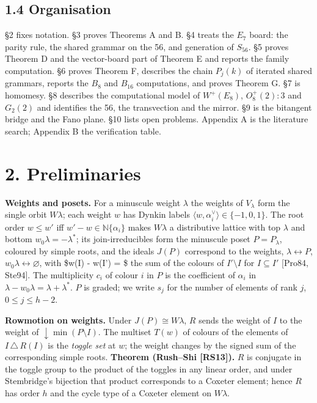 \documentclass[
]{article}
\begin{document}
\subsection{1.4 Organisation}\label{organisation}

§2 fixes notation. §3 proves Theorems A and B. §4 treats the \(E_7\)
board: the parity rule, the shared grammar on the 56, and generation of
\(S_{56}\). §5 proves Theorem D and the vector-board part of Theorem E
and reports the family computation. §6 proves Theorem F, describes the
chain \(P_j(k)\) of iterated shared grammars, reports the \(B_8\) and
\(B_{16}\) computations, and proves Theorem G. §7 is homomesy. §8
describes the computational model of \(W^+(E_8)\), \(O_8^+(2){:}3\) and
\(G_2(2)\) and identifies the 56, the transvection and the mirror. §9 is
the bitangent bridge and the Fano plane. §10 lists open problems.
Appendix A is the literature search; Appendix B the verification table.

\section{2. Preliminaries}\label{preliminaries}

\textbf{Weights and posets.} For a minuscule weight \(\lambda\) the
weights of \(V_\lambda\) form the single orbit \(W\lambda\); each weight
\(w\) has Dynkin labels
\(\langle w, \alpha_i^\vee \rangle \in \{-1,0,1\}\). The root order
\(w \le w'\) iff \(w' - w \in \mathbb{N}\{\alpha_i\}\) makes
\(W\lambda\) a distributive lattice with top \(\lambda\) and bottom
\(w_0\lambda = -\lambda^*\); its join-irreducibles form the minuscule
poset \(P = P_\lambda\), coloured by simple roots, and the ideals
\(J(P)\) correspond to the weights, \(\lambda \leftrightarrow P\),
\(w_0\lambda \leftrightarrow \varnothing\), with \$w(I) - w(I') = \$ the
sum of the colours of \(I' \setminus I\) for \(I \subseteq I'\)
{[}Pro84, Ste94{]}. The multiplicity \(c_i\) of colour \(i\) in \(P\) is
the coefficient of \(\alpha_i\) in
\(\lambda - w_0\lambda = \lambda + \lambda^*\). \(P\) is graded; we
write \(s_j\) for the number of elements of rank \(j\),
\(0 \le j \le h-2\).

\textbf{Rowmotion on weights.} Under \(J(P) \cong W\lambda\), \(R\)
sends the weight of \(I\) to the weight of
\(\downarrow\!\min(P\setminus I)\). The multiset \(T(w)\) of colours of
the elements of \(I \,\triangle\, R(I)\) is the \emph{toggle set} at
\(w\); the weight changes by the signed sum of the corresponding simple
roots. \textbf{Theorem (Rush--Shi {[}RS13{]}).} \(R\) is conjugate in
the toggle group to the product of the toggles in any linear order, and
under Stembridge's bijection that product corresponds to a Coxeter
element; hence \(R\) has order \(h\) and the cycle type of a Coxeter
element on \(W\lambda\).
\end{document}
